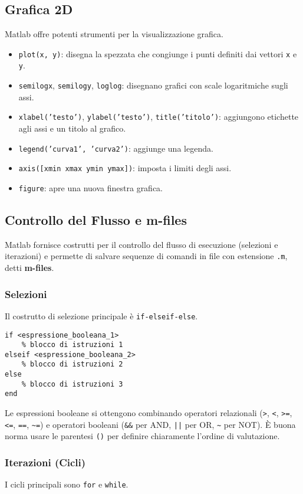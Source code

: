 \subsection{Grafica 2D}
Matlab offre potenti strumenti per la visualizzazione grafica.
\begin{itemize}
    \item \texttt{plot(x, y)}: disegna la spezzata che congiunge i punti definiti dai vettori \texttt{x} e \texttt{y}.
    \item \texttt{semilogx}, \texttt{semilogy}, \texttt{loglog}: disegnano grafici con scale logaritmiche sugli assi.
    \item \texttt{xlabel('testo')}, \texttt{ylabel('testo')}, \texttt{title('titolo')}: aggiungono etichette agli assi e un titolo al grafico.
    \item \texttt{legend('curva1', 'curva2')}: aggiunge una legenda.
    \item \texttt{axis([xmin xmax ymin ymax])}: imposta i limiti degli assi.
    \item \texttt{figure}: apre una nuova finestra grafica.
\end{itemize}

\subsection{Controllo del Flusso e m-files}
Matlab fornisce costrutti per il controllo del flusso di esecuzione (selezioni e iterazioni) e permette di salvare sequenze di comandi in file con estensione \texttt{.m}, detti \textbf{m-files}.

\subsubsection{Selezioni}
Il costrutto di selezione principale è \texttt{if-elseif-else}.
\begin{lstlisting}[frame=none, numbers=none]
if <espressione_booleana_1>
    % blocco di istruzioni 1
elseif <espressione_booleana_2>
    % blocco di istruzioni 2
else
    % blocco di istruzioni 3
end
\end{lstlisting}
Le espressioni booleane si ottengono combinando operatori relazionali (\verb|>|, \verb|<|, \verb|>=|, \verb|<=|, \verb|==|, \verb|~=|) e operatori booleani (\verb|&&| per AND, \verb#||# per OR, \verb|~| per NOT). È buona norma usare le parentesi \verb|()| per definire chiaramente l'ordine di valutazione.

\subsubsection{Iterazioni (Cicli)}
I cicli principali sono \texttt{for} e \texttt{while}.
